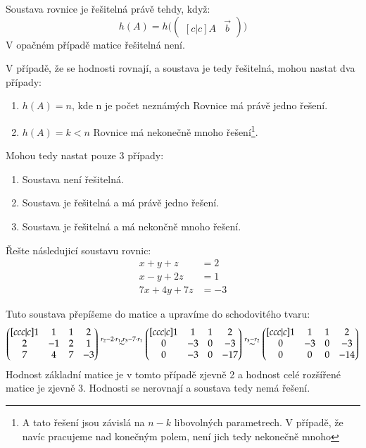 Soustava rovnice je řešitelná právě tehdy, když:
\[
    h(A) = h\Bigg (
    \begin{pmatrix}[c|c]
        A & \vec{b}
    \end{pmatrix} \Bigg )
\]
V opačném případě matice řešitelná není.

V případě, že se hodnosti rovnají, a soustava je tedy řešitelná, mohou nastat dva případy:
\begin{enumerate}
    \item $h(A) = n$, kde n je počet neznámých \hfill Rovnice má právě jedno řešení.
    \item $h(A) = k < n$ \hfill Rovnice má nekonečně mnoho řešení\footnote{A tato řešení jsou
    závislá na $n-k$ libovolných parametrech. V případě, že navíc pracujeme nad konečným polem, není jich
    tedy nekonečně mnoho}.
\end{enumerate}
Mohou tedy nastat pouze 3 případy:
\begin{enumerate}
    \item Soustava není řešitelná.
    \item Soustava je řešitelná a má právě jedno řešení.
    \item Soustava je řešitelná a má nekončně mnoho řešení.
\end{enumerate}

\begin{example}
    Řešte následujicí soustavu rovnic:
    \begin{align*}
        x + y + z &= 2 \\
        x - y + 2z &= 1 \\
        7x + 4y + 7z &= -3
    \end{align*}

    Tuto soustava přepíšeme do matice a upravíme do schodovitého tvaru:
    \[
        \begin{pmatrix}[ccc|c]
            1 & 1 & 1 & 2 \\
            2 & -1 & 2 & 1 \\
            7 & 4 & 7 & -3
        \end{pmatrix} \overset{r_2 - 2\cdot r_1, r_3 - 7\cdot r_1} \sim
        \begin{pmatrix}[ccc|c]
            1 & 1 & 1 & 2 \\
            0 & -3 & 0 & -3 \\
            0 & -3 & 0 & -17
        \end{pmatrix} \overset{r_3 - r_2} \sim
        \begin{pmatrix}[ccc|c]
            1 & 1 & 1 & 2 \\
            0 & -3 & 0 & -3 \\
            0 & 0 & 0 & -14
        \end{pmatrix}
    \]
    Hodnost základní matice je v tomto případě zjevně 2 a hodnost
    celé rozšířené matice je zjevně 3. Hodnosti se nerovnají a soustava tedy nemá řešení.
\end{example}
